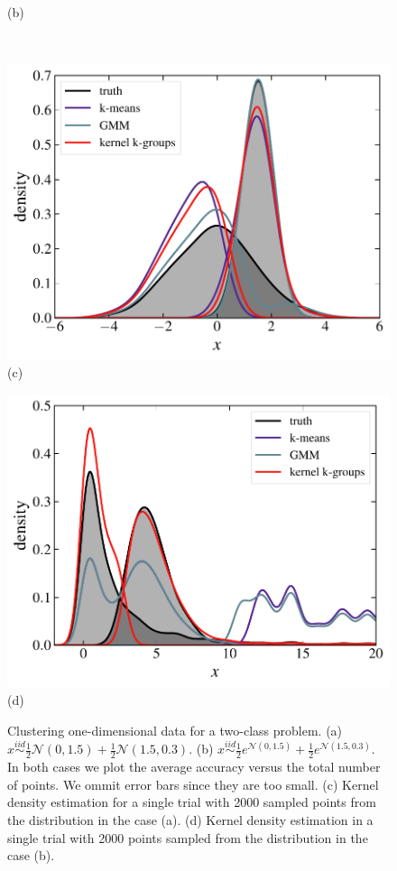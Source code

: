 \documentclass[10pt,journal,compsoc]{IEEEtran}
\begin{document}
\begin{figure}
\begin{minipage}{.4\textwidth}
(b)
\end{minipage}\\[1em]
\begin{minipage}{.37\textwidth}
\includegraphics[width=1\textwidth]{normal_density.pdf}\\[-2em]
(c)
\end{minipage}\hspace{2em}
\begin{minipage}{.37\textwidth}
\includegraphics[width=1\textwidth]{lognormal_density.pdf}\\[-2em]
(d)
\end{minipage}
\caption{
\label{fig:1dexperiment}
Clustering one-dimensional data for a two-class problem.
(a) $x \stackrel{iid}{\sim} \tfrac{1}{2} \mathcal{N}(0, 1.5) +
\tfrac{1}{2}\mathcal{N}(1.5,0.3)$. (b) $x \stackrel{iid}{\sim}
\tfrac{1}{2}e^{\mathcal{N}(0, 1.5)} + \tfrac{1}{2} e^{\mathcal{N}(1.5, 0.3)}$.
In both cases we plot the average accuracy versus the total number of points.
We ommit error bars since they are too small.
(c) Kernel density estimation for a single trial with 2000 sampled
points from the
distribution in the case (a). (d) Kernel density estimation in a single
trial with 
2000 points sampled from the distribution in the case (b).
}
\end{figure}
\end{document}
